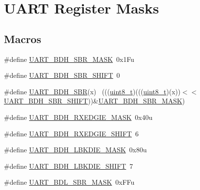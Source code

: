 \hypertarget{group___u_a_r_t___register___masks}{}\section{U\+A\+RT Register Masks}
\label{group___u_a_r_t___register___masks}
\subsection*{Macros}
\begin{DoxyCompactItemize}
\item 
\#define \hyperlink{group___u_a_r_t___register___masks_ga2680dc8176b0c933b4a1b77c5dbb64b7}{U\+A\+R\+T\+\_\+\+B\+D\+H\+\_\+\+S\+B\+R\+\_\+\+M\+A\+SK}~0x1\+Fu
\item 
\#define \hyperlink{group___u_a_r_t___register___masks_gac38d8a98be282d97c4837597a6c02cda}{U\+A\+R\+T\+\_\+\+B\+D\+H\+\_\+\+S\+B\+R\+\_\+\+S\+H\+I\+FT}~0
\item 
\#define \hyperlink{group___u_a_r_t___register___masks_ga28b137858fb0891d9d7e15f3664803c4}{U\+A\+R\+T\+\_\+\+B\+D\+H\+\_\+\+S\+BR}(x)                                                ~(((\hyperlink{_p_e___types_8h_aba7bc1797add20fe3efdf37ced1182c5}{uint8\+\_\+t})(((\hyperlink{_p_e___types_8h_aba7bc1797add20fe3efdf37ced1182c5}{uint8\+\_\+t})(x))$<$$<$\hyperlink{group___u_a_r_t___register___masks_gac38d8a98be282d97c4837597a6c02cda}{U\+A\+R\+T\+\_\+\+B\+D\+H\+\_\+\+S\+B\+R\+\_\+\+S\+H\+I\+FT}))\&\hyperlink{group___u_a_r_t___register___masks_ga2680dc8176b0c933b4a1b77c5dbb64b7}{U\+A\+R\+T\+\_\+\+B\+D\+H\+\_\+\+S\+B\+R\+\_\+\+M\+A\+SK})
\item 
\#define \hyperlink{group___u_a_r_t___register___masks_ga0882debd8f2c52d4ab8461b22b6519d9}{U\+A\+R\+T\+\_\+\+B\+D\+H\+\_\+\+R\+X\+E\+D\+G\+I\+E\+\_\+\+M\+A\+SK}~0x40u
\item 
\#define \hyperlink{group___u_a_r_t___register___masks_ga97c5d15ae3144492e364744236aa10f7}{U\+A\+R\+T\+\_\+\+B\+D\+H\+\_\+\+R\+X\+E\+D\+G\+I\+E\+\_\+\+S\+H\+I\+FT}~6
\item 
\#define \hyperlink{group___u_a_r_t___register___masks_ga88fb29d1cb045a09e851a31c689ef60e}{U\+A\+R\+T\+\_\+\+B\+D\+H\+\_\+\+L\+B\+K\+D\+I\+E\+\_\+\+M\+A\+SK}~0x80u
\item 
\#define \hyperlink{group___u_a_r_t___register___masks_gace1227bd2507a7c5df95398e097cb7af}{U\+A\+R\+T\+\_\+\+B\+D\+H\+\_\+\+L\+B\+K\+D\+I\+E\+\_\+\+S\+H\+I\+FT}~7
\item 
\#define \hyperlink{group___u_a_r_t___register___masks_ga4471e77a5cfda8db1950aac0b204d964}{U\+A\+R\+T\+\_\+\+B\+D\+L\+\_\+\+S\+B\+R\+\_\+\+M\+A\+SK}~0x\+F\+Fu
$$
\end{DoxyCompactItemize}
